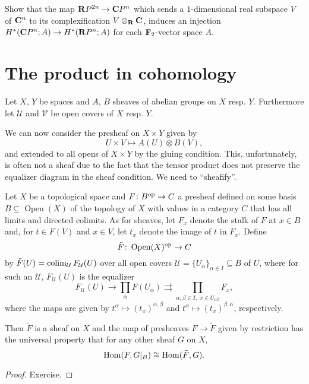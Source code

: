 \documentclass[a4paper,openany]{scrbook}
\DeclareMathOperator{\Open}{Open}
\begin{document}
\begin{exer}\label{exer:complexificationincohomology}
Show that the map $\mathbf R P^{2n} \to \mathbf C P^n$ which sends a $1$-dimensional real subspace $V$ of $\mathbf C^n$ to its complexification $V \otimes_\mathbf R \mathbf C$, induces an injection $H^*(\mathbf C P^n;A) \to H^*(\mathbf R P^n;A)$ for each $\mathbf F_2$-vector space $A$.
\end{exer}

\section{The product in cohomology}

Let $X$, $Y$ be spaces and $A$, $B$ sheaves of abelian groups on $X$ resp. $Y$. Furthermore let $\mathcal U$ and $\mathcal V$ be open covers of $X$ resp. $Y$. 

We can now consider the presheaf on $X \times Y$ given by
\[
U \times V \mapsto A(U) \otimes B(V),
\]
and extended to all opens of $X \times Y$ by the gluing condition. This, unfortunately, is often not a sheaf due to the fact that the tensor product does not preserve the equalizer diagram in the sheaf condition. We need to “sheafify”.

\begin{prop}
\label{prop:sheafification}	
Let $X$ be a topological space and $F\colon B^{\operatorname{op}} \to C$ a presheaf defined on some basis $B \subseteq \Open(X)$ of the topology of $X$ with values in a category $C$ that has all limits and directed colimits. As for sheaves, let $F_x$ denote the stalk of $F$ at $x \in B$ and, for $t \in F(V)$ and $x \in V$, let $t_x$ denote the image of $t$ in $F_x$. Define
\[
\tilde F\colon \Open(X)^\op \to C
\]
by $\tilde F(U) = \operatorname*{colim}_{\mathcal U} F_{\mathcal U}(U)$ over all open covers $\mathcal U = \{U_\alpha\}_{\alpha \in I} \subseteq B$ of $U$, where for such an $\mathcal U$, $F_{\mathcal U}(U)$ is the equalizer
\[
F_{\mathcal U}(U) \to \prod_{\alpha} F(U_\alpha) \rightrightarrows \prod_{\alpha,\beta \in I,\; x \in U_{\alpha\beta}} F_x,
\]
where the maps are given by $t^\alpha \mapsto (t_x)^{\alpha,\beta}$ and $t^\alpha \mapsto (t_x)^{\beta,\alpha}$, respectively.

Then $\tilde F$ is a sheaf on $X$ and the map of presheaves $F \to \tilde F$ given by restriction has the universal property that for any other sheaf $G$ on $X$,
\[
\operatorname{Hom}(F,G|_B) \cong \operatorname{Hom}(\tilde F,G).
\]
\end{prop}
\begin{proof}
Exercise.
\end{proof}
\end{document}
